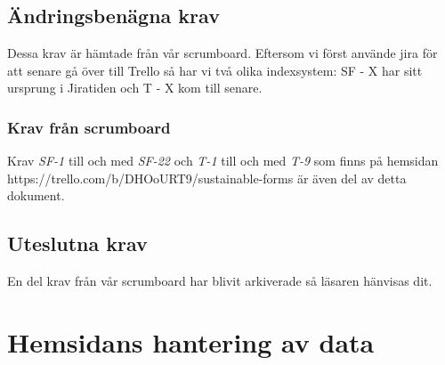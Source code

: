\documentclass{article}
\begin{document}
\subsection{Ändringsbenägna krav}
Dessa krav är hämtade från vår scrumboard. Eftersom vi först använde jira för att senare gå över till Trello så har vi två olika indexsystem: SF - X har sitt ursprung i Jiratiden och T - X kom till senare.

\subsubsection{Krav från scrumboard}
Krav \textit{SF-1} till och med \textit{SF-22} och \textit{T-1} till och med \textit{T-9} som finns på hemsidan \\ https://trello.com/b/DHOoURT9/sustainable-forms är även del av detta dokument.


    \subsection{Uteslutna krav}
       En del krav från vår scrumboard har blivit arkiverade så läsaren hänvisas dit.
     
    \newpage
     \section{Hemsidans hantering av data}
    
\end{document}
